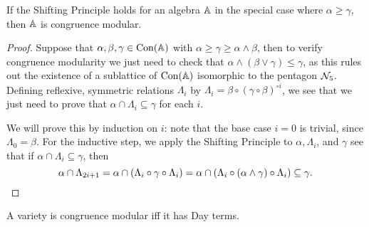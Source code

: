 \documentclass[letterpaper,11pt]{article}
\DeclareMathOperator{\Con}{Con}
\begin{document}
\begin{lem} If the Shifting Principle holds for an algebra $\mathbb{A}$ in the special case where $\alpha \ge \gamma$, then $\mathbb{A}$ is congruence modular.
\end{lem}
\begin{proof} Suppose that $\alpha, \beta, \gamma \in \Con(\bA)$ with $\alpha \ge \gamma \ge \alpha \wedge \beta$, then to verify congruence modularity we just need to check that $\alpha \wedge (\beta \vee \gamma) \le \gamma$, as this rules out the existence of a sublattice of $\Con(\bA)$ isomorphic to the pentagon $\mathcal{N}_5$. Defining reflexive, symmetric relations $\Lambda_i$ by $\Lambda_i = \beta\circ (\gamma\circ\beta)^{\circ i}$, we see that we just need to prove that $\alpha \cap \Lambda_i \subseteq \gamma$ for each $i$.

We will prove this by induction on $i$: note that the base case $i = 0$ is trivial, since $\Lambda_0 = \beta$. For the inductive step, we apply the Shifting Principle to $\alpha, \Lambda_i$, and $\gamma$ see that if $\alpha \cap \Lambda_i \subseteq \gamma$, then
\[
\alpha \cap \Lambda_{2i+1} = \alpha \cap (\Lambda_i \circ \gamma \circ \Lambda_i) = \alpha \cap (\Lambda_i \circ (\alpha\wedge \gamma) \circ \Lambda_i) \subseteq \gamma.\qedhere
\]
\end{proof}

\begin{cor} A variety is congruence modular iff it has Day terms.
\end{cor}
\end{document}

